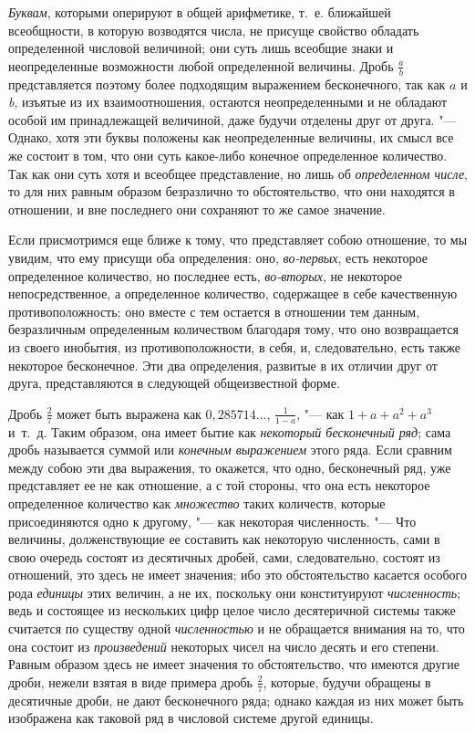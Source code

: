 {\em Буквам}, которыми оперируют в общей
арифметике, т.~е. ближайшей всеобщности, в которую возводятся числа, не
присуще свойство обладать определенной числовой величиной; они суть лишь
всеобщие знаки и неопределенные возможности любой определенной величины.
Дробь $\frac a b$ представляется поэтому более подходящим выражением
бесконечного, так как $a$ и
{\em b}, изъятые из их взаимоотношения, остаются
неопределенными и не обладают особой им принадлежащей величиной, даже
будучи отделены друг от друга. "--- Однако, хотя эти буквы положены как
неопределенные величины, их смысл все же состоит в том, что они суть
какое-либо конечное определенное количество. Так как они суть хотя и
всеобщее представление, но лишь об {\em определенном
числе}, то для них равным образом безразлично то обстоятельство, что они
находятся в отношении, и вне последнего они сохраняют то же самое значение.

Если присмотримся еще ближе к тому, что представляет собою отношение, то мы
увидим, что ему присущи оба определения: оно,
{\em во-первых}, есть некоторое определенное
количество, но последнее есть, {\em во-вторых}, не
некоторое непосредственное, а определенное количество, содержащее в себе
качественную противоположность; оно вместе с тем остается в отношении тем
данным, безразличным определенным количеством благодаря тому, что оно
возвращается из своего инобытия, из противоположности, в себя, и,
следовательно, есть также некоторое бесконечное. Эти два определения,
развитые в их отличии друг от друга, представляются в следующей
общеизвестной форме.

Дробь $\frac 2 7$ может быть выражена как $0{,}285714\ldots$,
$\frac 1{1-a}$,
"--- как $1 + a + a^2 + a^3$ и~т.~д. Таким образом, она имеет бытие как
{\em некоторый бесконечный ряд}; сама дробь называется
суммой или {\em конечным выражением} этого ряда. Если
сравним между собою эти два выражения, то окажется, что одно, бесконечный
ряд, уже представляет ее не как отношение, а с той стороны, что она есть
некоторое определенное количество как {\em множество}
таких количеств, которые присоединяются одно к другому, "--- как некоторая
численность. "--- Что величины, долженствующие ее составить как некоторую
численность, сами в свою очередь состоят из десятичных дробей, сами,
следовательно, состоят из отношений, это здесь не имеет значения; ибо это
обстоятельство касается особого рода {\em единицы} этих
величин, а не их, поскольку они конституируют
{\em численность}; ведь и состоящее из нескольких цифр
целое число десятеричной системы также считается по существу одной
{\em численностью} и не обращается внимания на то, что
она состоит из {\em произведений} некоторых чисел на
число десять и его степени. Равным образом здесь не имеет значения то
обстоятельство, что имеются другие дроби, нежели взятая в виде примера
дробь $\frac 2 7$, которые, будучи обращены в десятичные дроби, не дают
бесконечного ряда; однако каждая из них может быть изображена как таковой
ряд в числовой системе другой единицы.

